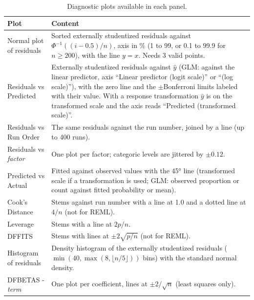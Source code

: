 \begin{table}[htbp]\centering\small
\caption{Diagnostic plots available in each panel.}\label{tab:ch05-diagplots}
\begin{tabularx}{\linewidth}{@{}>{\raggedright\arraybackslash}p{3.4cm} X@{}}
\toprule
Plot & Content \\
\midrule
Normal plot of residuals & Sorted externally studentized residuals against $\Phi^{-1}((i-0.5)/n)$, axis in \% (1 to 99, or 0.1 to 99.9 for $n\ge200$), with the line $y=x$. Needs 3 valid points. \\
Residuals vs Predicted & Externally studentized residuals against $\hat y$ (GLM: against the linear predictor, axis ``Linear predictor (logit scale)'' or ``(log scale)''), with the zero line and the $\pm$Bonferroni limits labeled with their value. With a response transformation $\hat y$ is on the transformed scale and the axis reads ``Predicted (transformed scale)''. \\
Residuals vs Run Order & The same residuals against the run number, joined by a line (up to 400 runs). \\
Residuals vs \emph{factor} & One plot per factor; categoric levels are jittered by $\pm0.12$. \\
Predicted vs Actual & Fitted against observed values with the 45° line (transformed scale if a transformation is used; GLM: observed proportion or count against fitted probability or mean). \\
Cook's Distance & Stems against run number with a line at 1.0 and a dotted line at $4/n$ (not for REML). \\
Leverage & Stems with a line at $2p/n$. \\
DFFITS & Stems with lines at $\pm2\sqrt{p/n}$ (not for REML). \\
Histogram of residuals & Density histogram of the externally studentized residuals ($\min(40,\max(8,\lfloor n/5\rfloor))$ bins) with the standard normal density. \\
DFBETAS - \emph{term} & One plot per coefficient, lines at $\pm2/\sqrt n$ (least squares only). \\
\bottomrule
\end{tabularx}
\end{table}

